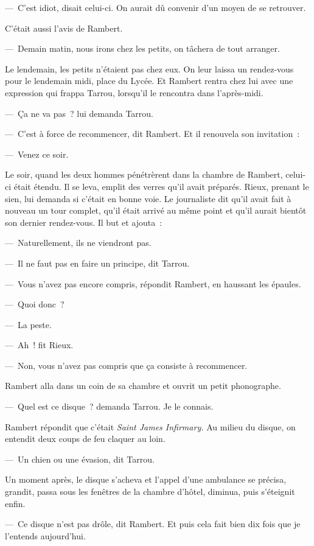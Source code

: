 \documentclass[french,twoside]{book} %
\begin{document}
— C’est idiot, disait celui-ci. On aurait dû convenir d’un moyen de se retrouver.\par
C’était aussi l’avis de Rambert.\par
— Demain matin, nous irons chez les petits, on tâchera de tout arranger.\par
Le lendemain, les petits n’étaient pas chez eux. On leur laissa un rendez-vous pour le lendemain midi, place du Lycée. Et Rambert rentra chez lui avec une expression qui frappa Tarrou, lorsqu’il le rencontra dans l’après-midi.\par
— Ça ne va pas ? lui demanda Tarrou.\par
— C’est à force de recommencer, dit Rambert. Et il renouvela son invitation :\par
— Venez ce soir.\par
Le soir, quand les deux hommes pénétrèrent dans la chambre de Rambert, celui-ci était étendu. Il se leva, emplit des verres qu’il avait préparés. Rieux, prenant le sien, lui demanda si c’était en bonne voie. Le journaliste dit qu’il avait fait à nouveau un tour complet, qu’il était arrivé au même point et qu’il aurait bientôt son dernier rendez-vous. Il but et ajouta :\par
— Naturellement, ils ne viendront pas.\par
— Il ne faut pas en faire un principe, dit Tarrou.\par
— Vous n’avez pas encore compris, répondit Rambert, en haussant les épaules.\par
— Quoi donc ?\par
— La peste.\par
— Ah ! fit Rieux.\par
— Non, vous n’avez pas compris que ça consiste à recommencer.\par
Rambert alla dans un coin de sa chambre et ouvrit un petit phonographe.\par
— Quel est ce disque ? demanda Tarrou. Je le connais.\par
Rambert répondit que c’était \emph{Saint James Infirmary.} Au milieu du disque, on entendit deux coups de feu claquer au loin.\par
— Un chien ou une évasion, dit Tarrou.\par
Un moment après, le disque s’acheva et l’appel d’une ambulance se précisa, grandit, passa sous les fenêtres de la chambre d’hôtel, diminua, puis s’éteignit enfin.\par
— Ce disque n’est pas drôle, dit Rambert. Et puis cela fait bien dix fois que je l’entends aujourd’hui.\par
\end{document}
